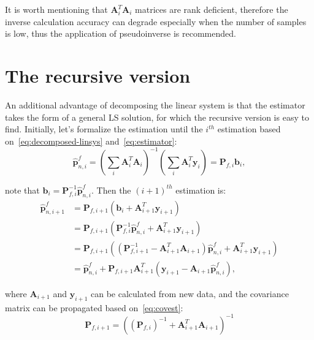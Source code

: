 It is worth mentioning that $\mathbf{A}_i^T\mathbf{A}_i$ matrices are rank deficient, therefore the inverse calculation accuracy can degrade especially when the number of samples is low, thus the application of pseudoinverse is recommended.

\section{The recursive version}

An additional advantage of decomposing the linear system is that the estimator takes the form of a general LS solution, for which the recursive version is easy to find. Initially, let's formalize the estimation until the $i^{th}$ estimation based on~\eqref{eq:decomposed-linsys} and~\eqref{eq:estimator}:
\begin{equation}
    \hat{\mathbf{p}}_{n, i}^f={\left(\sum_{i}\mathbf{A}_i^T\mathbf{A}_i\right)}^{-1}\left(\sum_i\mathbf{A}_i^T\mathbf{y}_i\right) = \mathbf{P}_{f, i}\mathbf{b}_i,
\end{equation}

note that $\mathbf{b}_i=\mathbf{P}_{f, i}^{-1}\hat{\mathbf{p}}_{n, i}^f$. Then the ${(i+1)}^{th}$ estimation is:
\begin{equation}
\begin{aligned}
    \hat{\mathbf{p}}_{n, i+1}^f &= \mathbf{P}_{f, i+1}\left(\mathbf{b}_i + \mathbf{A}_{i+1}^T \mathbf{y}_{i+1}\right) \\ &=
    \mathbf{P}_{f, i+1}\left(\mathbf{P}_{f, i}^{-1}\hat{\mathbf{p}}_{n, i}^f + \mathbf{A}_{i+1}^T \mathbf{y}_{i+1}\right) \\ &=
    \mathbf{P}_{f, i+1}\left(\left(\mathbf{P}_{f, i+1}^{-1} - \mathbf{A}_{i+1}^T\mathbf{A}_{i+1}\right)\hat{\mathbf{p}}_{n, i}^f + \mathbf{A}_{i+1}^T \mathbf{y}_{i+1}\right) \\ &=
     \hat{\mathbf{p}}_{n, i}^f + \mathbf{P}_{f, i+1}\mathbf{A}_{i+1}^T\left( \mathbf{y}_{i+1} -\mathbf{A}_{i+1}\hat{\mathbf{p}}_{n, i}^f\right),
\end{aligned}
\end{equation}

where $\mathbf{A}_{i+1}$ and $\mathbf{y}_{i+1}$ can be calculated from new data, and the covariance matrix can be propagated based on~\eqref{eq:covest}:
\begin{equation}
     \mathbf{P}_{f, i+1} = {\left({(\mathbf{P}_{f, i})}^{-1}+\mathbf{A}_{i+1}^T\mathbf{A}_{i+1}\right)}^{-1}
\end{equation}